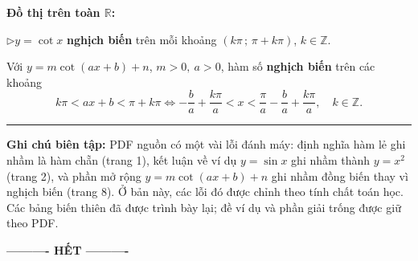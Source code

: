 \documentclass[12pt,a4paper]{article}
\newcommand{\tieumuc}[1]{\par\medskip{\bfseries\color{answerblue}#1}\par\smallskip}
\newcommand{\luuy}[1]{\par{\color{answerblue}$\triangleright$}\enspace #1\par}
\begin{document}
\textbf{Đồ thị trên toàn $\mathbb R$:}
\begin{center}
\end{center}
\luuy{$y=\cot x$ \textbf{nghịch biến} trên mỗi khoảng
$(k\pi\,;\,\pi+k\pi)$, $k\in\mathbb Z$.}
\tieumuc{Mở rộng}
Với $y=m\cot(ax+b)+n$, $m>0,\ a>0$, hàm số \textbf{nghịch biến} trên các khoảng
\[
k\pi<ax+b<\pi+k\pi
\Longleftrightarrow
-\frac ba+\frac{k\pi}{a}<x<
\frac{\pi}{a}-\frac ba+\frac{k\pi}{a},
\quad k\in\mathbb Z.
\]
\hrule\vspace{3mm}
{\small\textbf{Ghi chú biên tập:} PDF nguồn có một vài lỗi đánh máy: định nghĩa hàm lẻ ghi nhầm là hàm chẵn (trang 1), kết luận về ví dụ $y=\sin x$ ghi nhầm thành $y=x^2$ (trang 2), và phần mở rộng $y=m\cot(ax+b)+n$ ghi nhầm đồng biến thay vì nghịch biến (trang 8). Ở bản này, các lỗi đó được chỉnh theo tính chất toán học. Các bảng biến thiên đã được trình bày lại; đề ví dụ và phần giải trống được giữ theo PDF.}
\begin{center}\textbf{\color{questionpurple}---------- HẾT ----------}\end{center}
\end{document}
